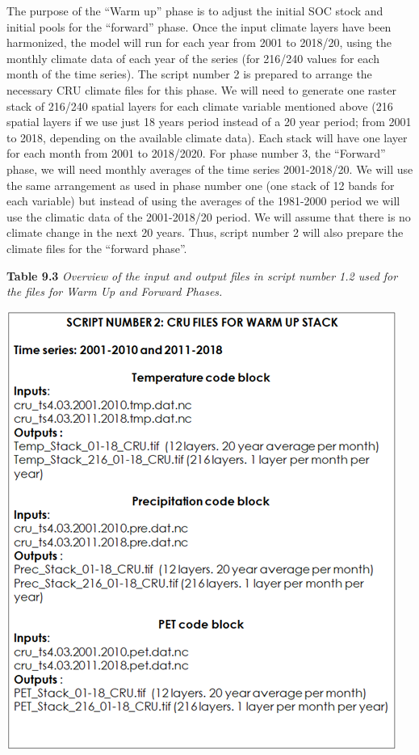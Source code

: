 \documentclass[
  10pt,
  b5paper,
]{book}
\begin{document}
The purpose of the ``Warm up'' phase is to adjust the initial SOC stock and initial pools for the ``forward'' phase. Once the input climate layers have been harmonized, the model will run for each year from 2001 to 2018/20, using the monthly climate data of each year of the series (for 216/240 values for each month of the time series). The script number 2 is prepared to arrange the necessary CRU climate files for this phase. We will need to generate one raster stack of 216/240 spatial layers for each climate variable mentioned above (216 spatial layers if we use just 18 years period instead of a 20 year period; from 2001 to 2018, depending on the available climate data). Each stack will have one layer for each month from 2001 to 2018/2020.
For phase number 3, the ``Forward'' phase, we will need monthly averages of the time series 2001-2018/20. We will use the same arrangement as used in phase number one (one stack of 12 bands for each variable) but instead of using the averages of the 1981-2000 period we will use the climatic data of the 2001-2018/20 period. We will assume that there is no climate change in the next 20 years. Thus, script number 2 will also prepare the climate files for the ``forward phase''.

\textbf{Table 9.3} \emph{Overview of the input and output files in script number 1.2 used for the files for Warm Up and Forward Phases.}

\includegraphics{tables/Table_9.2.png}
\end{document}
